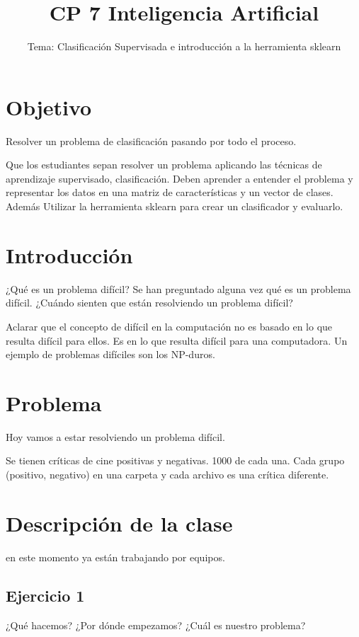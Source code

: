 \documentclass[a4paper,10pt]{article}
\title{CP 7 Inteligencia Artificial}
\author{Tema: Clasificación Supervisada e introducción a la 
herramienta sklearn}
\date{}
\begin{document}
\maketitle

\section*{Objetivo}
	Resolver un problema de clasificación pasando por todo el
	proceso.

  Que los estudiantes sepan resolver un problema aplicando las
  técnicas de aprendizaje supervisado, clasificación. Deben aprender a entender
  el problema y representar los datos en una matriz de
  características y un vector de clases. Además Utilizar la herramienta 
  sklearn para crear un clasificador y evaluarlo.

\section*{Introducción}
  ¿Qué es un problema difícil?
  Se han preguntado alguna vez qué es un problema difícil.
  ¿Cuándo sienten que están resolviendo un problema difícil?
  
  Aclarar que el concepto de difícil en la computación no es 
  basado en lo que resulta difícil para ellos. Es en lo que
  resulta difícil para una computadora. Un ejemplo de problemas
  difíciles son los NP-duros.
  
\section*{Problema}
  Hoy vamos a estar resolviendo un problema difícil.
  
  Se tienen críticas de cine positivas y negativas. 1000 de cada una.
  Cada grupo (positivo, negativo) en una carpeta y cada archivo
  es una crítica diferente.
  
\section*{Descripción de la clase}

en este momento ya están trabajando por equipos.

  \subsection*{Ejercicio 1}
    ¿Qué hacemos?
    ¿Por dónde empezamos?
    ¿Cuál es nuestro problema?
    
\end{document}
